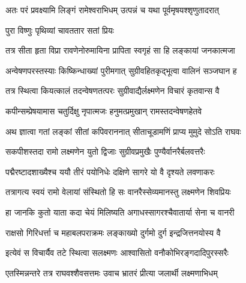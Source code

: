 


\storymeta


\twolineshloka
{अतः परं प्रवक्ष्यामि लिङ्गं रामेश्वराभिधम्} 
{उत्पन्नं च यथा पूर्वमृषयश्शृणुतादरात्}

\onelineshloka
{पुरा विष्णुः पृथिव्यां चावततार सतां प्रियः} %

\twolineshloka
{तत्र सीता हृता विप्रा रावणेनोरुमायिना} 
{प्रापिता स्वगृहं सा हि लङ्कायां जनकात्मजा} %

\twolineshloka
{अन्वेषणपरस्तस्याः किष्किन्धाख्यां पुरीमगात्} 
{सुग्रीवहितकृद्भूत्वा वालिनं सञ्जघान ह} %

\twolineshloka
{तत्र स्थित्वा कियत्कालं तदन्वेषणतत्परः} 
{सुग्रीवाद्यैर्लक्ष्मणेन विचारं कृतवान्स वै} %

\twolineshloka
{कपीन्सम्प्रेषयामास चतुर्दिक्षु नृपात्मजः} 
{हनुमत्प्रमुखान् रामस्तदन्वेषणहेतवे} %

\twolineshloka
{अथ ज्ञात्वा गतां लङ्कां सीतां कपिवराननात्} 
{सीताचूडामणिं प्राप्य मुमुदे सोऽति राघवः} %

\twolineshloka
{सकपीशस्तदा रामो लक्ष्मणेन युतो द्विजाः} 
{सुग्रीवप्रमुखैः पुण्यैर्वानरैर्बलवत्तरैः} %

\twolineshloka
{पद्मैरष्टादशाख्यैश्च ययौ तीरं पयोनिधेः}
{दक्षिणे सागरे यो वै दृश्यते लवणाकरः}

\twolineshloka
{तत्रागत्य स्वयं रामो वेलायां संस्थितो हि सः} 
{वानरैस्सेव्यमानस्तु लक्ष्मणेन शिवप्रियः} %

\twolineshloka
{हा जानकि कुतो याता कदा चेयं मिलिष्यति} 
{अगाधस्सागरश्चैवातार्या सेना च वानरी} %

\twolineshloka
{राक्षसो गिरिधर्त्ता च महाबलपराक्रमः}
{लङ्काख्यो दुर्गमो दुर्ग इन्द्रजित्तनयोस्य वै} %

\twolineshloka
{इत्येवं स विचार्यैव तटे स्थित्वा सलक्ष्मणः}
{आश्वासितो वनौकोभिरङ्गदादिपुरस्सरैः} %

\twolineshloka
{एतस्मिन्नन्तरे तत्र राघवश्शैवसत्तमः}
{उवाच भ्रातरं प्रीत्या जलार्थी लक्ष्मणाभिधम्} %



